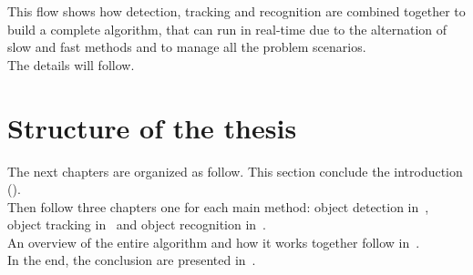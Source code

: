 This flow shows how detection, tracking and recognition are combined together to build a complete algorithm, that can run in real-time due to the alternation of slow and fast methods and to manage all the problem scenarios.\\
The details will follow.

\section{Structure of the thesis}
The next chapters are organized as follow. This section conclude the introduction ().\\
Then follow three chapters one for each main method: object detection in~, object tracking in~ and object recognition in~.\\
An overview of the entire algorithm and how it works together follow  in~.\\
In the end, the conclusion are presented in~.





